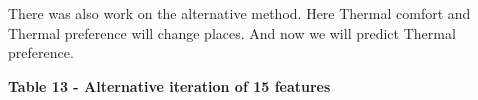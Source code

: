 
There was also work on the alternative method. Here Thermal comfort and
Thermal preference will change places. And now we will predict Thermal
preference.

{\bfseries Table 13 - Alternative iteration of 15 features}

